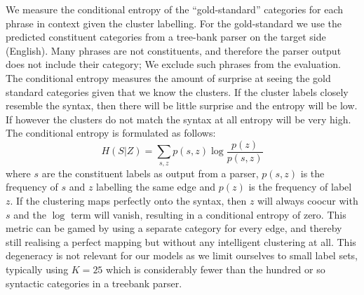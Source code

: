 We measure the conditional entropy of the ``gold-standard'' categories for each phrase in context given the cluster labelling. For the gold-standard we use the predicted constituent categories from a tree-bank parser on the target side (English). Many phrases are not constituents, and therefore the parser output does not include their category; We exclude such phrases from the evaluation. The conditional entropy measures the amount of surprise at seeing the gold standard categories given that we know the clusters. If the cluster labels closely resemble the syntax, then there will be little surprise and the entropy will be low. If however the clusters do not match the syntax at all entropy will be very high. The conditional entropy is formulated as follows:
\[ H(S|Z) = \sum_{s,z} p(s,z) \log \frac{p(z)}{p(s,z)} \]
where $s$ are the constituent labels as output from a parser, $p(s,z)$ is the frequency of $s$ and $z$ labelling the same edge and $p(z)$ is the frequency of label $z$. If the clustering maps perfectly onto the syntax, then $z$ will always coocur with $s$ and the $\log$ term will vanish, resulting in a conditional entropy of zero. This metric can be gamed by using a separate category for every edge, and thereby still realising a perfect mapping but without any intelligent clustering at all. This degeneracy is not relevant for our models as we limit ourselves to small label sets, typically using $K = 25$ which is considerably fewer than the hundred or so syntactic categories in a treebank parser. 

